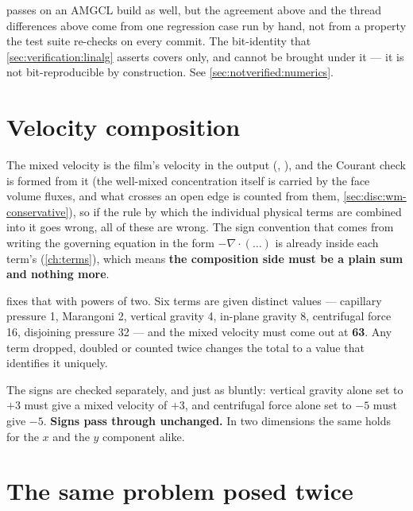 \begin{warn}
   passes on an AMGCL build as well, but the agreement above and
  the thread
  differences above come from one regression case run by hand, not from a
  property the test suite re-checks on every commit. The bit-identity that
  \cref{sec:verification:linalg} asserts covers 
  only, and  cannot be brought under it --- it is not
  bit-reproducible by construction. See \cref{sec:notverified:numerics}.
\end{warn}

\section{Velocity composition}
\label{sec:verification:velocity}

The mixed velocity is the film's velocity in the output (,
), and the Courant check is formed from it (the well-mixed
concentration itself is carried by the face volume fluxes, and what crosses
an open edge is counted from them, \cref{sec:disc:wm-conservative}), so if the rule by
which the individual physical terms are combined into it goes wrong, all of
these are wrong. The sign convention that comes from writing the governing equation
in the form $-\nabla\cdot(\dots)$ is already inside each term's
 (\cref{ch:terms}), which means \textbf{the composition side
must be a plain sum and nothing more}.

 fixes that with powers of two. Six terms are
given distinct values --- capillary pressure 1, Marangoni 2, vertical gravity
4, in-plane gravity 8, centrifugal force 16, disjoining pressure 32 --- and the
mixed velocity must come out at \textbf{63}. Any term dropped, doubled or
counted twice changes the total to a value that identifies it uniquely.

The signs are checked separately, and just as bluntly: vertical gravity alone
set to $+3$ must give a mixed velocity of $+3$, and centrifugal force alone set
to $-5$ must give $-5$. \textbf{Signs pass through unchanged.} In two
dimensions the same holds for the $x$ and the $y$ component alike.

\section{The same problem posed twice}
\label{sec:verification:equivalence}

